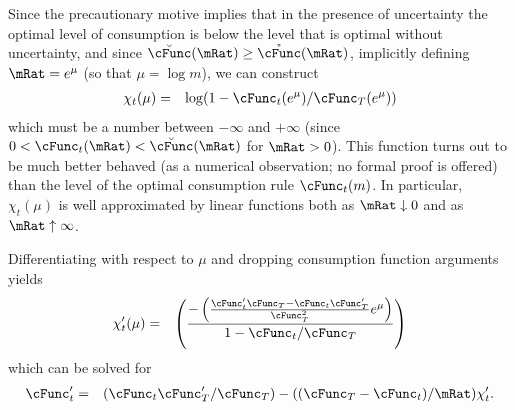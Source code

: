 \documentclass[../BufferStockTheory.tex]{subfiles}
\begin{document}
Since the precautionary motive implies that in the presence of
uncertainty the optimal level of consumption is below the level that is
optimal without uncertainty, and since $\breve{\cFunc}(\mRat) \geq \mathring{\cFunc}(\mRat)$,
implicitly defining $\mRat = e^{\mu}$ (so that $\mu = \log m$), we can construct
\begin{eqnarray}
 \chi_{t}(\mu) & = & \log (1-\cFunc_{t}(e^{\mu})/\cFunc_{T}(e^{\mu}))  \label{eq:ChiDef}
\end{eqnarray}
which must be a number between $-\infty$ and $+\infty$ (since $0 < \cFunc_{t}(\mRat) < \breve{\cFunc}(\mRat)$ for $\mRat > 0$).  This function turns out to be much better behaved (as
a numerical observation; no formal proof is offered) than the level of the optimal consumption rule $\cFunc_{t}(m)$.  In particular, $\chi_{t}(\mu)$ is well approximated by linear functions both as $\mRat \downarrow 0$ and as $\mRat \uparrow \infty$.

Differentiating with respect to $\mu$ and dropping consumption function arguments
yields
\begin{eqnarray}
 \chi^{\prime}_{t}(\mu) & = & \left(\frac{-\left(\frac{\cFunc^{\prime}_{t}\cFunc_{T}-\cFunc_{t}\cFunc_{T}^{\prime}}{\cFunc_{T}^{2}}e^{\mu}\right)}{1-\cFunc_{t}/\cFunc_{T}}\right) \label{eq:ChiPDef}
\end{eqnarray}
which can be solved for
\begin{eqnarray}
 \cFunc^{\prime}_{t} & = & (\cFunc_{t}\cFunc_{T}^{\prime}/\cFunc_{T})-((\cFunc_{T}-\cFunc_{t})/\mRat)\chi^{\prime}_{t} \label{eq:cFuncPFromChi}.
\end{eqnarray}

\begin{comment} %
\begin{eqnarray}
 \lim_{\mu \downarrow -\infty} \chi^{\prime}(\mu) & = & \left(\frac{-\left(\frac{\cFunc^{\prime}_{t}\cFunc_{T}^{\prime}\mRat-\cFunc_{t}^{\prime}\mRat\cFunc_{T}^{\prime}}{(\cFunc_{T}^{\prime}\mRat)^{2}}\mRat\right)}{(\cFunc_{T}^{\prime}\mRat-\cFunc_{t}^{\prime}\mRat)/\cFunc_{T}^{\prime}\mRat}\right)
\\ & = & \left(\frac{-\left(\frac{\cFunc^{\prime}_{t}\cFunc_{T}^{\prime}-\cFunc_{t}^{\prime}\cFunc_{T}^{\prime}}{(\cFunc_{T}^{\prime})^{2}}\right)}{(\cFunc_{T}^{\prime}-\cFunc_{t}^{\prime})/\cFunc_{T}^{\prime}}\right)
\\ & = & \left(\frac{-\left(\cFunc^{\prime}_{t}\cFunc_{T}^{\prime}-\cFunc_{t}^{\prime}\cFunc_{T}^{\prime}\right)}{(\cFunc_{T}^{\prime}-\cFunc_{t}^{\prime})\cFunc_{T}^{\prime}}\right)
\end{eqnarray}
\end{comment}
\end{document}
